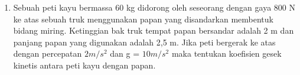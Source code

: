 \documentclass[12pt,a4paper,draft,final,oneside,twoside,openright,openany]{article}
\begin{document}
\begin{enumerate}
		
		\item  Sebuah peti kayu bermassa 60 kg didorong oleh seseorang dengan gaya 800 N ke atas sebuah truk menggunakan papan yang disandarkan membentuk bidang miring. Ketinggian bak truk tempat papan bersandar adalah 2 m dan panjang papan yang digunakan adalah 2,5 m. Jika peti bergerak ke atas dengan percepatan $2 m/s^2$ dan g = $10 m/s^2$ maka tentukan koefisien gesek kinetis antara peti kayu dengan papan.
	\end{enumerate}
\end{document}
